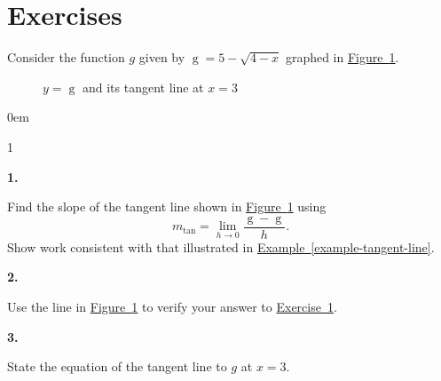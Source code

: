 \documentclass[12pt,]{book}
\theoremstyle{plain}
\theoremstyle{definition}
\numberwithin{equation}{section}
\newenvironment{exercisegroup}%
{\medskip\noindent}%
{\par\bigskip}%
\newlength{\exercisegroupindent}%
\newlength{\exercisegroupitemwidth}%
\newenvironment{exercisegrouplist}%
{\vspace{-\partopsep}%
\begin{adjustwidth}{\exercisegroupindent}{0em}}%
{\end{adjustwidth}%
\vspace{-\partopsep}%
\vspace{\baselineskip}}%
\newenvironment{exercisegroupbycol}[1]%
{\begin{exercisegrouplist}%
\vspace{-\multicolsep}%
\begin{multicols}{#1}%
\setlength{\parindent}{0em}%
\setlength{\exercisegroupitemwidth}{\linewidth}}%
{\end{multicols}%
\vspace{-\multicolsep}%
\end{exercisegrouplist}}%
\newenvironment{exercisegroupitem}[1]%
{\begin{minipage}[t]{\exercisegroupitemwidth}
\vspace{0pt}%
{\bfseries#1}%
\rule{0pt}{\baselineskip}}{\strut%
\end{minipage}%
\hspace{\columnsep}}%
\providecommand\phantomsection{}
\newcommand{\fe}[2]{\mathop{{#1}{\left(#2\right)}}}
\begin{document}
\section*{Exercises}\label{exercises-18}

\begin{exercisegroup}%
Consider the function \(g\) given by \(\fe{g}{x}=5-\sqrt{4-x}\) graphed in \hyperref[figure-tangent-line-exercise]{Figure~\ref*{figure-tangent-line-exercise}}.%
\begin{figure}
\centering
{
}
\caption{\(y=\fe{g}{x}\) and its tangent line at \(x=3\)\label{figure-tangent-line-exercise}}
\end{figure}
\begin{exercisegroupbycol}{1}%
\begin{exercisegroupitem}{1. }\phantomsection\hypertarget{exercise-tangent-line}{\null}
 Find the slope of the tangent line shown in \hyperref[figure-tangent-line-exercise]{Figure~\ref*{figure-tangent-line-exercise}} using \[m_{\text{tan}}=\lim_{h\to0}\frac{\fe{g}{3+h}-\fe{g}{3}}{h}\text{.}\] Show work consistent with that illustrated in \hyperref[example-tangent-line]{Example~\ref*{example-tangent-line}}.%
\end{exercisegroupitem}%
\par%
\begin{exercisegroupitem}{2. }\phantomsection\hypertarget{exercise-126}{\null}
Use the line in \hyperref[figure-tangent-line-exercise]{Figure~\ref*{figure-tangent-line-exercise}} to verify your answer to \hyperref[exercise-tangent-line]{Exercise~1}.%
\end{exercisegroupitem}%
\par%
\begin{exercisegroupitem}{3. }\phantomsection\hypertarget{exercise-127}{\null}
State the equation of the tangent line to \(g\) at \(x=3\).%
\end{exercisegroupitem}%
\par%
\end{exercisegroupbycol}%
\end{exercisegroup}%
\typeout{************************************************}
\typeout{************************************************}
\end{document}
